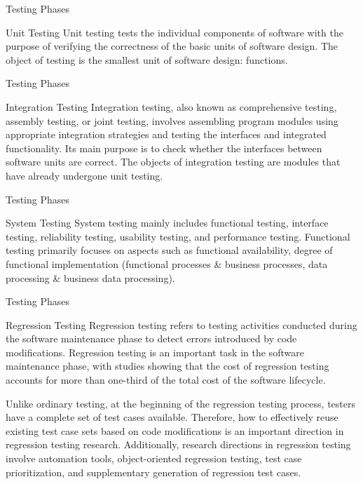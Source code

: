 \documentclass{beamer}
\begin{document}
\begin{frame}[t]{Testing Phases}
    \begin{block}
        {Unit Testing}
Unit testing tests the individual components of software with the purpose of verifying the correctness of the basic units of software design. The object of testing is the smallest unit of software design: functions.
    \end{block}
\end{frame}

\begin{frame}[t]{Testing Phases}
    \begin{block}{Integration Testing}
Integration testing, also known as comprehensive testing, assembly testing, or joint testing, involves assembling program modules using appropriate integration strategies and testing the interfaces and integrated functionality. Its main purpose is to check whether the interfaces between software units are correct. The objects of integration testing are modules that have already undergone unit testing.
    \end{block}
\end{frame}

\begin{frame}[t]{Testing Phases}
    \begin{block}{System Testing}
System testing mainly includes functional testing, interface testing, reliability testing, usability testing, and performance testing. Functional testing primarily focuses on aspects such as functional availability, degree of functional implementation (functional processes \& business processes, data processing \& business data processing).
    \end{block}
\end{frame}

\begin{frame}[t]{Testing Phases}
    \begin{block}{Regression Testing}
Regression testing refers to testing activities conducted during the software maintenance phase to detect errors introduced by code modifications. Regression testing is an important task in the software maintenance phase, with studies showing that the cost of regression testing accounts for more than one-third of the total cost of the software lifecycle.

Unlike ordinary testing, at the beginning of the regression testing process, testers have a complete set of test cases available. Therefore, how to effectively reuse existing test case sets based on code modifications is an important direction in regression testing research. Additionally, research directions in regression testing involve automation tools, object-oriented regression testing, test case prioritization, and supplementary generation of regression test cases.
\end{block}
\end{frame}
\end{document}
